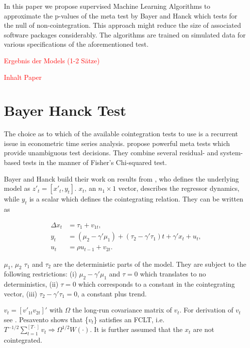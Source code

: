 \documentclass[12pt,a4paper]{article}
\begin{document}
In this paper we propose supervised Machine Learning Algorithms to
approximate the p-values of the meta test by Bayer and Hanck
\autocite*{Bayerhanck_2012} which tests for the null of
non-cointegration. This approach might reduce the size of associated
software packages considerably. The algorithms are trained on simulated
data for various specifications of the aforementioned test.

\textcolor{red}{Ergebnis der Models (1-2 Sätze)}

\textcolor{red}{Inhalt Paper}

\hypertarget{bayer-hanck-test}{%
\section{Bayer Hanck Test}\label{bayer-hanck-test}}

The choice as to which of the available cointegration tests to use is a
recurrent issue in econometric time series analysis.
\textcite{Bayerhanck_2012} propose powerful meta tests which provide
unambiguous test decisions. They combine several residual- and
system-based tests in the manner of Fisher's \autocite*{Fisher_1932}
Chi-squared test.

Bayer and Hanck build their work on results from
\textcite{Pesavento_2004}, who defines the underlying model as
\(z'_t = [x'_t, y_t]\). \(x_t\), an \(n_1 \times 1\) vector, describes
the regressor dynamics, while \(y_t\) is a scalar which defines the
cointegrating relation. They can be written as

\begin{align}
\Delta x_t &= \tau_1 + v_{1t}, \\
y_t &= (\mu_2 - \gamma' \mu_1) + (\tau_2 - \gamma' \tau_1) t + \gamma' x_t + u_t, \\
u_t &= \rho u_{t-1} + v_{2t}.
\end{align}

\(\mu_1\), \(\mu_2\) \(\tau_1\) and \(\tau_2\) are the deterministic
parts of the model. They are subject to the following restrictions: (i)
\(\mu_2 - \gamma' \mu_1\) and \(\tau = 0\) which translates to no
deterministics, (ii) \(\tau = 0\) which corresponds to a constant in the
cointegrating vector, (iii) \(\tau_2 - \gamma' \tau_1 = 0\), a constant
plus trend.

\(v_t = [v'_{1t} v_{2t}]'\) with \(\Omega\) the long-run covariance
matrix of \(v_t\). For derivation of \(v_t\) see
\textcite{Pesavento_2004}. Pesavento shows that \{\(v_t\)\} satisfies an
FCLT,
i.e.~\(T^{-1/2} \sum^{[T \cdot]}_{t=1} v_t \Rightarrow \Omega^{1/2} W(\cdot)\).
It is further assumed that the \(x_t\) are not cointegrated.
\end{document}

